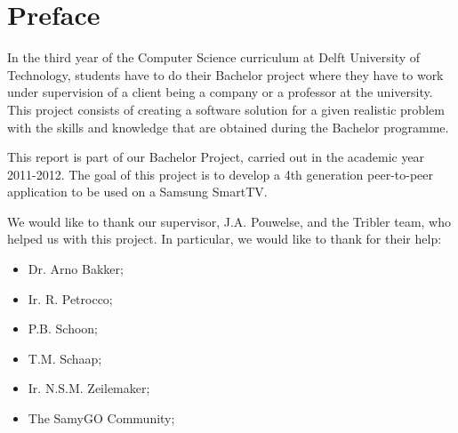 \chapter*{Preface}
In the third year of the Computer Science curriculum at Delft University of Technology, students have to do their Bachelor project where they have to work under supervision of a client being a company or a professor at the university. This project consists of creating a software solution for a given realistic problem with the skills and knowledge that are obtained during the Bachelor programme.

This report is part of our Bachelor Project, carried out in the academic year 2011-2012. The goal of this project is to develop a 4th generation peer-to-peer application to be used on a Samsung SmartTV.

We would like to thank our supervisor, J.A. Pouwelse, and the Tribler team, who helped us with this project. In particular, we would like to thank for their help:

\begin{itemize}
\item Dr. Arno Bakker;
\item Ir. R. Petrocco;
\item P.B. Schoon;
\item T.M. Schaap;
\item Ir. N.S.M. Zeilemaker;
\item The SamyGO Community;

\end{itemize}
